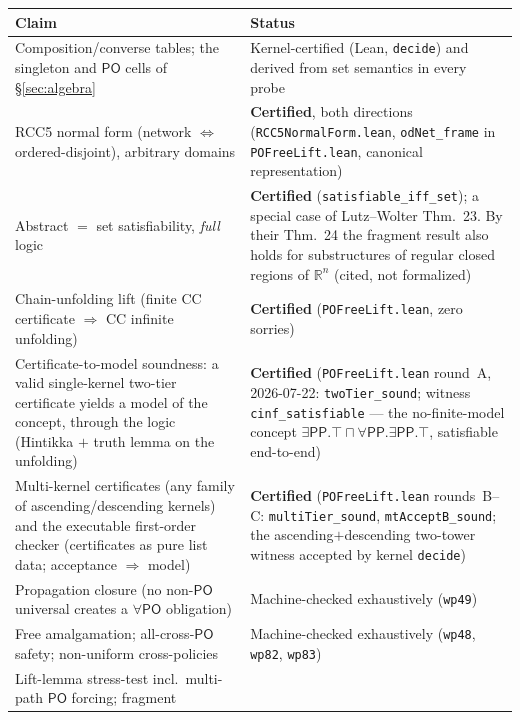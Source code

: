 \documentclass[11pt]{article}
\newcommand{\PO}{\ensuremath{\mathsf{PO}}}
\newcommand{\PP}{\ensuremath{\mathsf{PP}}}
\newcommand{\code}[1]{\texttt{#1}}
\begin{document}
\begin{center}
\small
\begin{tabular}{@{}>{\raggedright\arraybackslash}p{}>{\raggedright\arraybackslash}p{}@{}}
\toprule
\textbf{Claim} & \textbf{Status}\\
\midrule
Composition/converse tables; the singleton and $\PO$ cells of
\S\ref{sec:algebra} & Kernel-certified (Lean, \code{decide}) and
derived from set semantics in every probe\\[0.3em]
RCC5 normal form (network $\Leftrightarrow$ ordered-disjoint),
arbitrary domains & \textbf{Certified}, both directions
(\code{RCC5NormalForm.lean}, \code{odNet\_frame} in \code{POFreeLift.lean},
canonical representation)\\[0.3em]
Abstract $=$ set satisfiability, \emph{full} logic & \textbf{Certified}
(\code{satisfiable\_iff\_set}); a special case of Lutz--Wolter Thm.~23. By
their Thm.~24 the fragment result also holds for substructures of regular
closed regions of $\mathbb{R}^n$ (cited, not formalized)\\[0.3em]
Chain-unfolding lift (finite CC certificate $\Rightarrow$ CC infinite
unfolding) & \textbf{Certified} (\code{POFreeLift.lean}, zero
sorries)\\[0.3em]
Certificate-to-model soundness: a valid single-kernel two-tier
certificate yields a model of the concept, through the logic (Hintikka
$+$ truth lemma on the unfolding) & \textbf{Certified}
(\code{POFreeLift.lean} round~A, 2026-07-22: \code{twoTier\_sound};
witness \code{cinf\_satisfiable} --- the no-finite-model concept
$\exists\PP.\top\sqcap\forall\PP.\exists\PP.\top$, satisfiable
end-to-end)\\[0.3em]
Multi-kernel certificates (any family of ascending/descending kernels)
and the executable first-order checker (certificates as pure list
data; acceptance $\Rightarrow$ model) & \textbf{Certified}
(\code{POFreeLift.lean} rounds~B--C: \code{multiTier\_sound},
\code{mtAcceptB\_sound}; the ascending$+$descending two-tower witness
accepted by kernel \code{decide})\\[0.3em]
Propagation closure (no non-$\PO$ universal creates a $\forall\PO$
obligation) & Machine-checked exhaustively (\code{wp49})\\[0.3em]
Free amalgamation; all-cross-$\PO$ safety; non-uniform cross-policies
& Machine-checked exhaustively (\code{wp48}, \code{wp82},
\code{wp83})\\[0.3em]
Lift-lemma stress-test incl.\ multi-path $\PO$ forcing; fragment

\end{tabular}
\end{center}
\end{document}

